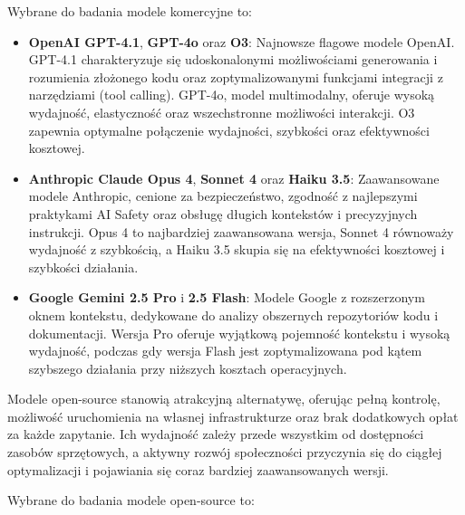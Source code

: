 Wybrane do badania modele komercyjne to:

\begin{itemize}
    \item \textbf{OpenAI GPT-4.1}, \textbf{GPT-4o} oraz \textbf{O3}: Najnowsze flagowe modele OpenAI. GPT-4.1 charakteryzuje się udoskonalonymi możliwościami generowania i rozumienia złożonego kodu oraz zoptymalizowanymi funkcjami integracji z narzędziami (tool calling). GPT-4o, model multimodalny, oferuje wysoką wydajność, elastyczność oraz wszechstronne możliwości interakcji. O3 zapewnia optymalne połączenie wydajności, szybkości oraz efektywności kosztowej.
    \item \textbf{Anthropic Claude Opus 4}, \textbf{Sonnet 4} oraz \textbf{Haiku 3.5}: Zaawansowane modele Anthropic, cenione za bezpieczeństwo, zgodność z najlepszymi praktykami AI Safety oraz obsługę długich kontekstów i precyzyjnych instrukcji. Opus 4 to najbardziej zaawansowana wersja, Sonnet 4 równoważy wydajność z szybkością, a Haiku 3.5 skupia się na efektywności kosztowej i szybkości działania.
    \item \textbf{Google Gemini 2.5 Pro} i \textbf{2.5 Flash}: Modele Google z rozszerzonym oknem kontekstu, dedykowane do analizy obszernych repozytoriów kodu i dokumentacji. Wersja Pro oferuje wyjątkową pojemność kontekstu i wysoką wydajność, podczas gdy wersja Flash jest zoptymalizowana pod kątem szybszego działania przy niższych kosztach operacyjnych.
\end{itemize}

Modele open-source stanowią atrakcyjną alternatywę, oferując pełną kontrolę, możliwość uruchomienia na własnej infrastrukturze oraz brak dodatkowych opłat za każde zapytanie. Ich wydajność zależy przede wszystkim od dostępności zasobów sprzętowych, a aktywny rozwój społeczności przyczynia się do ciągłej optymalizacji i pojawiania się coraz bardziej zaawansowanych wersji.

Wybrane do badania modele open-source to:

